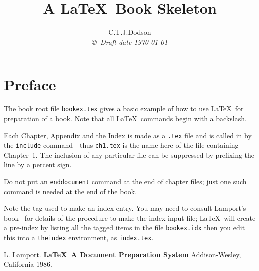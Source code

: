 \documentclass[12pt,leqno]{book}
\title{A \LaTeX \ Book Skeleton  }
\author{C.T.J.Dodson  \\
{\small\em \copyright \  Draft date \today }}
\date{ }
\begin{document}
\maketitle
\tableofcontents
\listoffigures
\listoftables
\chapter*{Preface}\normalsize
\pagestyle{plain}
The book root file {\tt bookex.tex} gives a basic example of how to
use \LaTeX \ for preparation of a book. Note that all
\LaTeX \ commands begin with a
backslash.

Each
Chapter, Appendix and the Index is made as a {\tt *.tex} file and is
called in by the {\tt include} command---thus {\tt ch1.tex} is
the name here of the file containing Chapter~1. The inclusion of any
particular file can be suppressed by prefixing the line by a
percent sign.


 Do not put an {\tt end{document}} command at the end of chapter files;
just one such command is needed at the end of the book.

Note the tag used to make an index entry. You may need to consult Lamport's
book~\cite{lamport} for details of the procedure to make the index input
file; \LaTeX \ will create a pre-index by listing all the tagged
items in the file {\tt bookex.idx} then you edit this into
a {\tt theindex} environment, as {\tt index.tex}.





\pagestyle{headings}




\begin{thebibliography}{99}
 L. Lamport. {\bf \LaTeX \ A Document Preparation System}
Addison-Wesley, California 1986.
\end{thebibliography}


\end{document}
